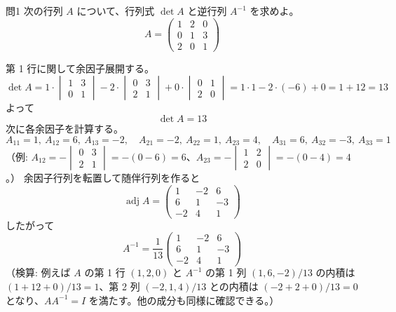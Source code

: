 \documentclass[a4paper,11pt]{article}
\begin{document}
\clearpage
\begin{mondaiboxS}{問1}
次の行列 $A$ について、行列式 $\det A$ と逆行列 $A^{-1}$ を求めよ。
\[
A =
\begin{pmatrix}
1 & 2 & 0 \\
0 & 1 & 3 \\
2 & 0 & 1
\end{pmatrix}
\]
\end{mondaiboxS}
\kaitou
第 1 行に関して余因子展開する。
\[
\det A = 1\cdot\begin{vmatrix}1 & 3\\ 0 & 1\end{vmatrix}
- 2\cdot\begin{vmatrix}0 & 3\\ 2 & 1\end{vmatrix}
+ 0\cdot\begin{vmatrix}0 & 1\\ 2 & 0\end{vmatrix}
= 1\cdot 1 - 2\cdot(-6) + 0 = 1 + 12 = 13
\]
よって
\[
\boxed{\; \det A = 13 \;}
\]
次に各余因子を計算する。
\[
A_{11}=1,\ A_{12}=6,\ A_{13}=-2,\quad
A_{21}=-2,\ A_{22}=1,\ A_{23}=4,\quad
A_{31}=6,\ A_{32}=-3,\ A_{33}=1
\]
（例: $A_{12} = -\begin{vmatrix}0&3\\2&1\end{vmatrix} = -(0-6)=6$、$A_{23} = -\begin{vmatrix}1&2\\2&0\end{vmatrix} = -(0-4)=4$。）
余因子行列を転置して随伴行列を作ると
\[
\operatorname{adj}A =
\begin{pmatrix}
1 & -2 & 6 \\
6 & 1 & -3 \\
-2 & 4 & 1
\end{pmatrix}
\]
したがって
\[
\boxed{\; A^{-1} = \frac{1}{13}
\begin{pmatrix}
1 & -2 & 6 \\
6 & 1 & -3 \\
-2 & 4 & 1
\end{pmatrix} \;}
\]
（検算: 例えば $A$ の第 1 行 $(1,2,0)$ と $A^{-1}$ の第 1 列 $(1,6,-2)/13$ の内積は $(1+12+0)/13=1$、第 2 列 $(-2,1,4)/13$ との内積は $(-2+2+0)/13=0$ となり、$AA^{-1}=I$ を満たす。他の成分も同様に確認できる。）
\end{document}
